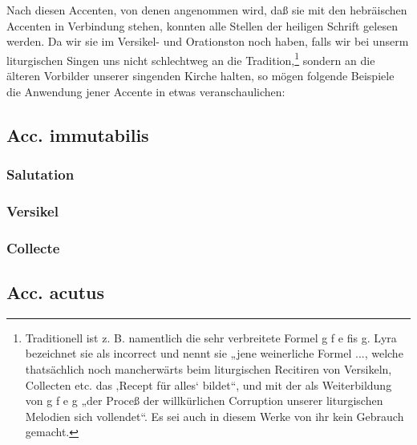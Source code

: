 Nach diesen Accenten, von denen angenommen wird, daß sie mit den hebräischen Accenten in Verbindung stehen, konnten alle Stellen der heiligen Schrift gelesen werden. Da wir sie im Versikel- und Orationston noch haben, falls wir bei unserm liturgischen Singen uns nicht schlechtweg an die Tradition,\footnote{Traditionell ist z. B. namentlich die sehr verbreitete Formel g f e fis g. Lyra bezeichnet sie als incorrect und nennt sie „jene weinerliche Formel ..., welche thatsächlich noch mancherwärts beim liturgischen Recitiren von Versikeln, Collecten etc. das ‚Recept für alles‘ bildet“, und mit der als Weiterbildung von g f e g „der Proceß der willkürlichen Corruption unserer liturgischen Melodien sich vollendet“. Es sei auch in diesem Werke von ihr kein Gebrauch gemacht.} sondern an die älteren Vorbilder unserer singenden Kirche halten, so mögen folgende Beispiele die Anwendung jener Accente in etwas veranschaulichen:

\subsection{Acc. immutabilis}

\subsubsection{Salutation}


\subsubsection{Versikel}


\subsubsection{Collecte}


\subsection{Acc. acutus}


